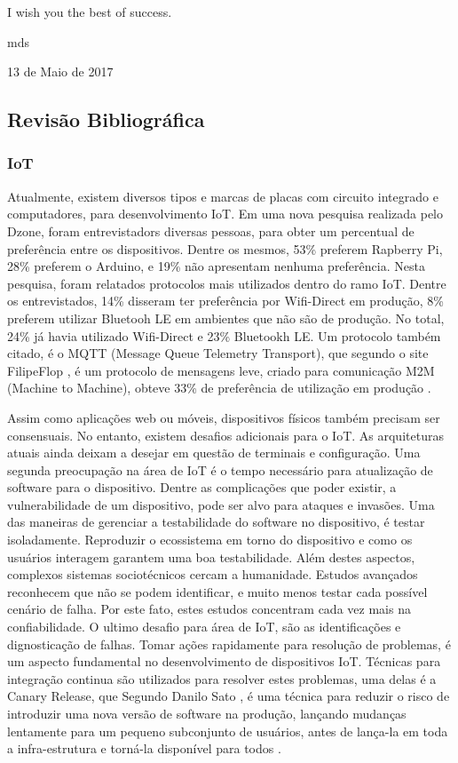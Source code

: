 \documentclass[journal]{IEEEtran}
\begin{document}
I wish you the best of success.

\hfill mds
 
\hfill 13 de Maio de 2017

\subsection{Revisão Bibliográfica}
\subsubsection{IoT}

Atualmente, existem diversos tipos e marcas de placas com circuito integrado e computadores, para desenvolvimento IoT. Em uma nova pesquisa realizada pelo Dzone, foram entrevistadors diversas pessoas, para obter um percentual de preferência entre os dispositivos. Dentre os mesmos, 53\% preferem Rapberry Pi, 28\% preferem o Arduino, e 19\% não apresentam nenhuma preferência. Nesta pesquisa, foram relatados protocolos mais utilizados dentro do ramo IoT. Dentre os entrevistados, 14\% disseram ter preferência por Wifi-Direct em produção, 8\% preferem utilizar Bluetooh LE em ambientes que não são de produção. No total, 24\% já havia utilizado Wifi-Direct e 23\% Bluetookh LE. Um protocolo também citado, é o MQTT (Message Queue Telemetry Transport), que segundo o site FilipeFlop \cite{filipeflopnodemcu}, é um protocolo de mensagens leve, criado para comunicação M2M (Machine to Machine),  obteve 33\% de preferência de utilização em produção \cite[p.~4]{dzoneiotvolume4}.

Assim como aplicações web ou móveis, dispositivos físicos também precisam ser consensuais. No entanto, existem desafios adicionais para o IoT. As arquiteturas atuais ainda deixam a desejar em questão de terminais e configuração. Uma segunda preocupação na área de IoT é o tempo necessário para atualização de software para o dispositivo. Dentre as  complicações que poder existir, a vulnerabilidade de um dispositivo, pode ser alvo para ataques e invasões. Uma das maneiras de gerenciar a testabilidade do software no dispositivo, é testar isoladamente. Reproduzir o ecossistema em torno do dispositivo e como os usuários interagem garantem uma boa testabilidade. Além destes aspectos, complexos sistemas sociotécnicos cercam a humanidade. Estudos avançados reconhecem que não se podem identificar, e muito menos testar cada possível cenário de falha. Por este fato, estes estudos concentram cada vez mais na confiabilidade. O ultimo desafio para área de IoT, são as identificações e dignosticação de falhas. Tomar ações rapidamente para resolução de problemas, é um aspecto fundamental no desenvolvimento de dispositivos IoT. Técnicas para integração continua são utilizados para resolver estes problemas, uma delas é a Canary Release, que Segundo Danilo Sato \cite{danilosato2017}, é uma técnica para reduzir o risco de introduzir uma nova versão de software na produção, lançando mudanças lentamente para um pequeno subconjunto de usuários, antes de lança-la em toda a infra-estrutura e torná-la disponível para todos \cite[p.~9]{dzoneiotvolume4}.
\end{document}
